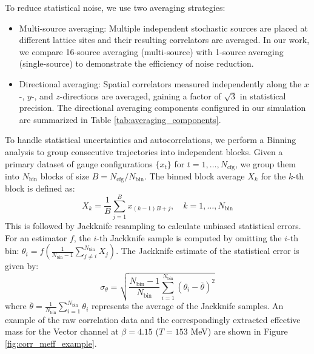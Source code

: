 To reduce statistical noise, we use two averaging strategies:
\begin{itemize}
    \item Multi-source averaging: Multiple independent stochastic sources are placed at different lattice sites and their resulting correlators are averaged. In our work, we compare 16-source averaging (multi-source) with 1-source averaging (single-source) to demonstrate the efficiency of noise reduction.
    \item Directional averaging: Spatial correlators measured independently along the $x$-, $y$-, and $z$-directions are averaged, gaining a factor of $\sqrt{3}$ in statistical precision. The directional averaging components configured in our simulation are summarized in Table \ref{tab:averaging_components}.
\end{itemize}

\begin{table}[H]
\centering
\renewcommand{\arraystretch}{1.2}
\small
\setlength{\tabcolsep}{0.5pt}
\caption{Summary of meson operators, components, and spatial directions averaged to perform directional averaging.}
\label{tab:averaging_components}
\end{table}

To handle statistical uncertainties and autocorrelations, we perform a Binning analysis to group consecutive trajectories into independent blocks.\cite{flyvbjergErrorEstimatesAverages1989} Given a primary dataset of gauge configurations $\{x_t\}$ for $t = 1, \dots, N_{\text{cfg}}$, we group them into $N_{\text{bin}}$ blocks of size $B = N_{\text{cfg}} / N_{\text{bin}}$. The binned block average $X_k$ for the $k$-th block is defined as:
\begin{equation}
X_k = \frac{1}{B} \sum_{j=1}^{B} x_{(k-1)B + j}, \quad k = 1, \dots, N_{\text{bin}}
\label{eq:binning_formula}
\end{equation}
This is followed by Jackknife resampling to calculate unbiased statistical errors. For an estimator $f$, the $i$-th Jackknife sample is computed by omitting the $i$-th bin: $\theta_i = f\left( \frac{1}{N_{\text{bin}} - 1} \sum_{j \neq i}^{N_{\text{bin}}} X_j \right)$. The Jackknife estimate of the statistical error is given by:
\begin{equation}
\sigma_{\theta} = \sqrt{ \frac{N_{\text{bin}} - 1}{N_{\text{bin}}} \sum_{i=1}^{N_{\text{bin}}} (\theta_i - \overline{\theta})^2 }
\label{eq:jackknife_error_formula}
\end{equation}
where $\overline{\theta} = \frac{1}{N_{\text{bin}}} \sum_{i=1}^{N_{\text{bin}}} \theta_i$ represents the average of the Jackknife samples. An example of the raw correlation data and the correspondingly extracted effective mass for the Vector channel at $\beta=4.15$ ($T=153$ MeV) are shown in Figure \ref{fig:corr_meff_example}.

